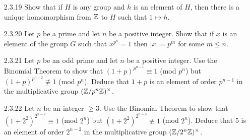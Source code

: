 \begin{enumerate}
      \textbf{Proof.} Let $n \in \Z^+$, $Z_n = \cyc{x}$, $H$ a group, and
      $h^n  = 1$ for some $h \in H$. First we shall show the existence of a
      homomorphism from $Z_n$ to $H$ such that $x \mapsto h$. So consider the
      map $\alpha : \cyc{x} \rightarrow H$ defined by $\alpha(x^a) = h^a$.
      Clearly $\alpha(x) = h$. Now we will show that $\alpha$ is well defined.
      Suppose $x^w = x^y$ for some $x^w, x^y \in Z_n$. Thus $w = y + nk$ for
      some integer $k$. Thus
      $$\alpha(x^w) = \alpha(x^{y+nk})=h^{y+nk}=h^{y}{h^n}^k =h^y=\alpha(x^y),$$
      so that $\alpha$ is well defined. Now we have that
      $$\alpha(x^px^q)=\alpha(x^{p+q})=h^{p+q}=h^ph^q=\alpha(x^p)\alpha(x^q),$$
      so that $\alpha$ is an homomorphism. Now to show uniqueness, we suppose
      that $\phi : \cyc{x} \rightarrow H$ is an homommorphism such that
      $\phi(x) = h$. Since $\phi$ is a homomorphism, it follows that
      $\phi(x^a) = h^a$. Thus $\phi = \alpha$. \qed
   \item[2.3.19]  Show that if $H$ is any group and $h$ is an element of $H$,
                  then there is a unique homomorphism from $\mathbb{Z}$ to $H$ such that
                  $1 \mapsto h$.
   \item[2.3.20]  Let $p$ be a prime and let $n$ be a positive integer. Show
                  that if $x$ is an element of the group $G$ such that
                  $x^{p^n} = 1$ then $|x| = p^m$ for some $m \le n$.
   \item[2.3.21]  Let $p$ be an odd prime and let $n$ be a positive integer. Use
                  the Binomial Theorem to show that
                  $(1+p)^{p^{n-1}} \equiv 1$ (mod $p^n$) but
                  $(1+p)^{p^{n-2}} \not\equiv 1$ (mod $p^n$). Deduce that $1+p$
                  is an element of order $p^{n-1}$ in the multiplicative group
                  $(\mathbb{Z}/p^n\mathbb{Z})^\times$.
   \item[2.3.22]  Let $n$ be an integer $\ge 3$. Use the Binomial Theorem to
                  show that $(1+2^2)^{2^{n-2}} \equiv 1$ (mod $2^n$) but
                  $(1+2^2)^{2^{n-3}} \not\equiv 1$ (mod $2^n$). Deduce that 5 is
                  an element of order $2^{n-2}$ in the multiplicative group
                  $(\mathbb{Z}/2^n\mathbb{Z})^\times$.

\end{enumerate}
